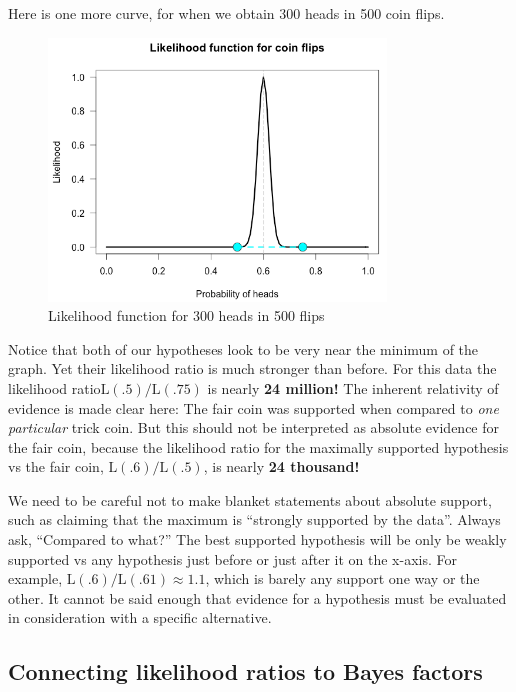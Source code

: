 Here is one more curve, for when we obtain 300 heads in 500 coin flips.

\begin{figure}[h]
    \centering
\includegraphics[width=0.8\textwidth]{pic/p05c03-snip04.png}
    \caption{Likelihood function for  300 heads in 500  flips}
    \label{fig:p05c03-snip04}
\end{figure}

Notice that both of our hypotheses look to be very near the minimum of the graph. Yet their likelihood ratio is much stronger than before. For this data the likelihood ratio$\mathrm{L}(.5) / \mathrm{L}(.75)$ is nearly \textbf{24 million!} The inherent relativity of evidence is made clear here: The fair coin was supported when compared to \textit{one particular} trick coin. But this should not be interpreted as absolute evidence for the fair coin, because the likelihood ratio for the maximally supported hypothesis vs the fair coin, $\mathrm{L}(.6) / \mathrm{L}(.5)$, is nearly \textbf{24 thousand!}

We need to be careful not to make blanket statements about absolute support, such as claiming that the maximum is ``strongly supported by the data''. Always ask, ``Compared to what?'' The best supported hypothesis will be only be weakly supported vs any hypothesis just before or just after it on the x-axis. For example, $\mathrm{L}(.6) / \mathrm{L}(.61) \approx 1.1$, which is barely any support one way or the other. It cannot be said enough that evidence for a hypothesis must be evaluated in consideration with a specific alternative.

\subsection{Connecting likelihood ratios to Bayes factors}

